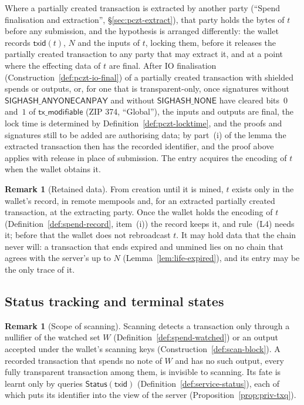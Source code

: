 \documentclass[11pt,a4paper]{article}
\theoremstyle{definition}
\newtheorem{remark}[theorem]{Remark}
\begin{document}
Where a partially created transaction is extracted by another party
(``Spend finalisation and extraction'', \S\ref{sec:pczt-extract}), that
party holds the bytes of $t$ before any submission, and the hypothesis is
arranged differently: the wallet records $\mathsf{txid}(t)$, $N$ and the
inputs of $t$, locking them, before it releases the partially created
transaction to any party that may extract it, and at a point where the
effecting data of $t$ are final. After IO finalisation
(Construction~\ref{def:pczt-io-final}) of a partially created transaction
with shielded spends or outputs, or, for one that is transparent-only, once
signatures without $\mathsf{SIGHASH\_ANYONECANPAY}$ and without
$\mathsf{SIGHASH\_NONE}$ have cleared bits~$0$ and~$1$ of
$\mathsf{tx\_modifiable}$ (ZIP 374, ``Global''), the inputs and outputs are
final, the
lock time is determined by Definition~\ref{def:pczt-locktime}, and the
proofs and signatures still to be added are authorising data; by part~(i) of
the lemma the extracted transaction then has the recorded identifier, and
the proof above applies with release in place of submission. The entry
acquires the encoding of $t$ when the wallet obtains it.

\begin{remark}[Retained data]
From creation until it is mined, $t$ exists only in the wallet's record,
in remote mempools and, for an extracted partially created transaction, at
the extracting party. Once the wallet holds the encoding of $t$
(Definition~\ref{def:spend-record}, item~(i)) the record keeps it, and
rule~(L4) needs it; before that the wallet does not rebroadcast $t$. It may
hold data that the chain never will: a transaction that ends expired and
unmined lies on no chain that agrees with the server's up to $N$
(Lemma~\ref{lem:life-expired}), and its entry may be the only trace of it.
\end{remark}

\subsection{Status tracking and terminal states}\label{sec:life-status}

\begin{remark}[Scope of scanning]
Scanning detects a transaction only through a nullifier of the watched set
$W$ (Definition~\ref{def:spend-watched}) or an output accepted under the
wallet's scanning keys (Construction~\ref{def:scan-block}). A recorded
transaction that spends no note of $W$ and has no such output, every fully
transparent transaction among them, is invisible to scanning. Its fate is
learnt only by queries $\mathsf{Status}(\mathsf{txid})$
(Definition~\ref{def:service-status}), each of which puts its identifier
into the view of the server (Proposition~\ref{prop:priv-txq}).
\end{remark}
\end{document}
